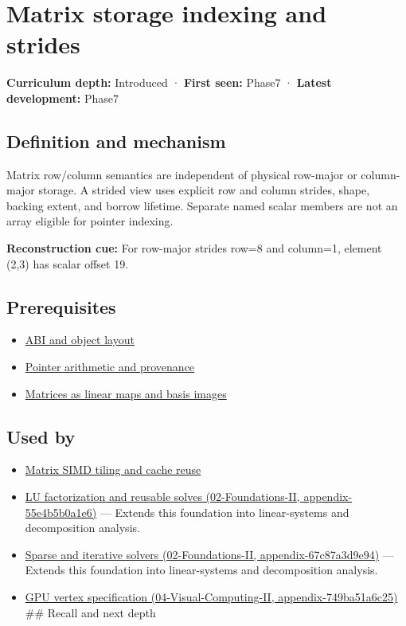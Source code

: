 \hypertarget{appendix-ffdc1d4e5350}{}
\section{Matrix storage indexing and strides}\label{appendix-ffdc1d4e5350-matrix-storage-indexing-and-strides}

\textbf{Curriculum depth:} Introduced · \textbf{First seen:} Phase7 · \textbf{Latest development:} Phase7

\subsection{Definition and mechanism}\label{appendix-ffdc1d4e5350-definition-and-mechanism}

Matrix row/column semantics are independent of physical row-major or column-major storage. A strided view uses explicit row and column strides, shape, backing extent, and borrow lifetime. Separate named scalar members are not an array eligible for pointer indexing.

\textbf{Reconstruction cue:} For row-major strides row=8 and column=1, element (2,3) has scalar offset 19.

\subsection{Prerequisites}\label{appendix-ffdc1d4e5350-prerequisites}

\begin{itemize}
\tightlist
\item
  \hyperref[appendix-c4ac6bb0fff8]{ABI and object layout}
\item
  \hyperref[appendix-6af5921bc853]{Pointer arithmetic and provenance}
\item
  \hyperref[appendix-bd39c3bf5d64]{Matrices as linear maps and basis images}
\end{itemize}

\subsection{Used by}\label{appendix-ffdc1d4e5350-used-by}

\begin{itemize}
\item
  \hyperref[appendix-1bfb7c657105]{Matrix SIMD tiling and cache reuse}
\item
  \href{../02-Foundations-II/main.pdf\#nameddest=appendix-55e4b5b0a1e6}{LU factorization and reusable solves (02-Foundations-II, appendix-55e4b5b0a1e6)} --- Extends this foundation into linear-systems and decomposition analysis.
\item
  \href{../02-Foundations-II/main.pdf\#nameddest=appendix-67c87a3d9e94}{Sparse and iterative solvers (02-Foundations-II, appendix-67c87a3d9e94)} --- Extends this foundation into linear-systems and decomposition analysis.
\item
  \href{../04-Visual-Computing-II/main.pdf\#nameddest=appendix-749ba51a6c25}{GPU vertex specification (04-Visual-Computing-II, appendix-749ba51a6c25)} \#\# Recall and next depth
\end{itemize}

